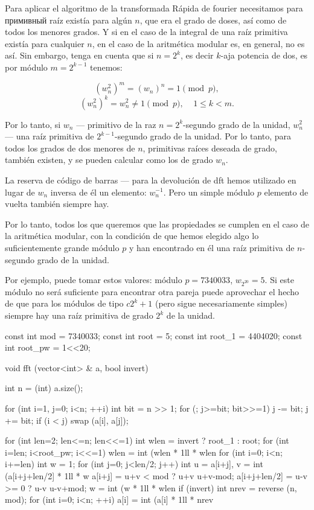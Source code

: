 Para aplicar el algoritmo de la transformada Rápida de fourier necesitamos para примивный raíz existía para algún $n$, que era el grado de doses, así como de todos los menores grados. Y si en el caso de la integral de una raíz primitiva existía para cualquier $n$, en el caso de la aritmética modular es, en general, no es así. Sin embargo, tenga en cuenta que si $n = 2^k$, es decir $k$-aja potencia de dos, es por módulo $m = 2^{k-1}$ tenemos:

$$ (w_n^2)^m = (w_n)^n = 1 \pmod p, $$
$$ (w_n^2)^k = w_n^{2} \ne 1 {\pmod p}, ~~~~~ 1 \le k < m. $$

Por lo tanto, si $w_n$ --- primitivo de la raz $n=2^k$-segundo grado de la unidad, $w_n^2$ --- una raíz primitiva de $2^{k-1}$-segundo grado de la unidad. Por lo tanto, para todos los grados de dos menores de $n$, primitivas raíces deseada de grado, también existen, y se pueden calcular como los de grado $w_n$.

La reserva de código de barras --- para la devolución de dft hemos utilizado en lugar de $w_n$ inversa de él un elemento: $w_n^{-1}$. Pero un simple módulo $p$ elemento de vuelta también siempre hay.

Por lo tanto, todos los que queremos que las propiedades se cumplen en el caso de la aritmética modular, con la condición de que hemos elegido algo lo suficientemente grande módulo $p$ y han encontrado en él una raíz primitiva de $n$-segundo grado de la unidad.

Por ejemplo, puede tomar estos valores: módulo $p = 7340033$, $w_{2^{20}} = 5$. Si este módulo no será suficiente para encontrar otra pareja puede aprovechar el hecho de que para los módulos de tipo $c 2^k + 1$ (pero sigue necesariamente simples) siempre hay una raíz primitiva de grado $2^k$ de la unidad.

\code
const int mod = 7340033;
const int root = 5;
const int root_1 = 4404020;
const int root_pw = 1<<20;

void fft (vector<int> & a, bool invert) {
int n = (int) a.size();

for (int i=1, j=0; i<n; ++i) {
int bit = n >> 1;
for (; j>=bit; bit>>=1)
j -= bit;
j += bit;
if (i < j)
swap (a[i], a[j]);
}

for (int len=2; len<=n; len<<=1) {
int wlen = invert ? root_1 : root;
for (int i=len; i<root_pw; i<<=1)
wlen = int (wlen * 1ll * wlen %
for (int i=0; i<n; i+=len) {
int w = 1;
for (int j=0; j<len/2; j++) {
int u = a[i+j], v = int (a[i+j+len/2] * 1ll * w %
a[i+j] = u+v < mod ? u+v u+v-mod;
a[i+j+len/2] = u-v >= 0 ? u-v u-v+mod;
w = int (w * 1ll * wlen %
}
}
}
if (invert) {
int nrev = reverse (n, mod);
for (int i=0; i<n; ++i)
a[i] = int (a[i] * 1ll * nrev %
}
}
\endcode

